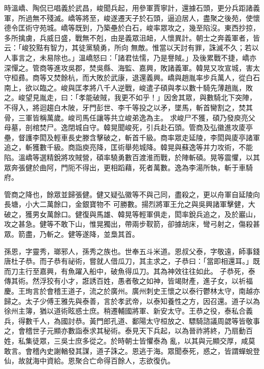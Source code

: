 \begin{pinyinscope}
 時溫嶠、陶侃已唱義於武昌，峻聞兵起，用參軍賈寧計，還據石頭，更分兵距諸義軍，所過無不殘滅。嶠等將至，峻遂遷天子於石頭，逼迫居人，盡聚之後苑，使懷德令匡術守苑城。嶠等既到，乃築壘於白石，峻率眾攻之，幾至陷沒。東西抄掠，多所擒虜，兵威日盛，戰無不剋，由是義眾沮衄，人懷異計。朝士之奔義軍者，皆云：「峻狡黠有智力，其徒黨驍勇，所向
 無敵。惟當以天討有罪，誅滅不久；若以人事言之，未易除也。」溫嶠怒曰：「諸君怯懦，乃是譽賊。」及後累戰不捷，嶠亦深憚之。管商等進攻吳郡，焚吳縣、海監、嘉興，敗諸義軍。韓晃又攻宣城，害太守桓彞。商等又焚餘杭，而大敗於武康，退還義興。嶠與趙胤率步兵萬人，從白石南上，欲以臨之。峻與匡孝將八千人逆戰，峻遣子碩與孝以數十騎先薄趙胤，敗之。峻望見胤走，曰：「孝能破賊，我更不如乎！」因舍其眾，與數騎北下突陣，不得入，將迴趨白木陂，牙門彭世、李千等投之以矛，墜馬，斬首臠割之，焚其骨，三軍皆稱萬歲。峻司馬任讓等共立峻弟逸為主。
 求峻尸不獲，碩乃發庾亮父母墓，剖棺焚尸。逸閉城自守。韓晃聞峻死，引兵赴石頭。管商及弘徽進攻庱亭壘，督護李閎及輕車長史滕含擊破之，斬首千級。商率眾走延陵，李閎與庱亭諸軍追之，斬獲數千級。商詣庾亮降，匡術舉苑城降。韓晃與蘇逸等并力攻術，不能陷。溫嶠等選精銳將攻賊營，碩率驍勇數百渡淮而戰，於陣斬碩。晃等震懼，以其眾奔張健於曲阿，門阨不得出，更相蹈藉，死者萬數。逸為李湯所執，斬于車騎府。



 管商之降也，餘眾並歸張健。健又疑弘徽等不與己同，盡殺之，更以舟軍自延陵向長塘，小大二萬餘口，金銀寶物不
 可勝數。揚烈將軍王允之與吳興諸軍擊健，大破之，獲男女萬餘口。健復與馬雄、韓晃等輕軍俱走，閎率銳兵追之，及於巖山，攻之甚急。健等不敢下山，惟晃獨出，帶兩步靫箭，卻據胡床，彎弓射之，傷殺甚眾。箭盡，乃斬之。健等遂降，並梟其首。



 孫恩，字靈秀，瑯邪人，孫秀之族也。世奉五斗米道。恩叔父泰，字敬遠，師事錢唐杜子恭。而子恭有祕術，嘗就人借瓜刀，其主求之，子恭曰：「當即相還耳。」既而刀主行至嘉興，有魚躍入船中，破魚得瓜刀。其為神效往往如此。
 子恭死，泰傳其術。然浮狡有小才，誑誘百姓，愚者敬之如神，皆竭財產，進子女，以祈福慶。王珣言於會稽王道子，流之於廣州。廣州刺史王懷之以泰行鬱林太守，南越亦歸之。太子少傅王雅先與泰善，言於孝武帝，以泰知養性之方，因召還。道子以為徐州主簿，猶以道術眩惑士庶。稍遷輔國將軍、新安太守。王恭之役，泰私合義兵，得數千人，為國討恭。黃門郎孔道、鄱陽太守桓放之、驃騎諮議周勰等皆敬事之，會稽世子元顯亦數詣泰求其秘術。泰見天下兵起，以為晉祚將終，乃扇動百姓，私集徒眾，三吳士庶多從之。於時朝士皆懼泰為
 亂，以其與元顯交厚，咸莫敢言。會稽內史謝輶發其謀，道子誅之。恩逃于海。眾聞泰死，惑之，皆謂蟬蛻登仙，故就海中資給。恩聚合亡命得百餘人，志欲復仇。




\end{pinyinscope}
